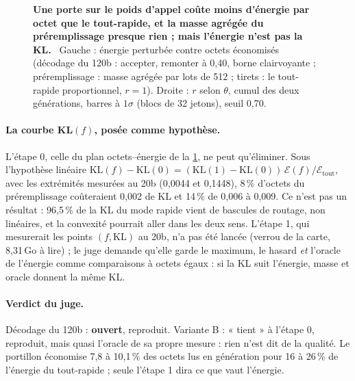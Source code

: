 \begin{figure}[tbp]
\centering
{}\hfill
{}
\caption[P6 : le plan octets--énergie et $r$ selon $\theta$]{\textbf{Une porte sur le poids d'appel coûte moins d'énergie par octet que le tout-rapide, et la masse agrégée du préremplissage presque rien ; mais l'énergie n'est pas la KL.} \mes~Gauche : énergie perturbée contre octets économisés (décodage du 120b : accepter, remonter à 0,40, borne clairvoyante ; préremplissage : masse agrégée par lots de 512 ; tirets : le tout-rapide proportionnel, $r = 1$). Droite : $r$ selon $\theta$, cumul des deux générations, barres à $1\sigma$ (blocs de 32 jetons), seuil 0,70. \HorsStyle{}}
\label{fig:t3-mim-p6}
\end{figure}

\paragraph{La courbe KL$(f)$, posée comme hypothèse.} L'étape 0, celle du plan octets--énergie de la \cref{fig:t3-mim-p6}, ne peut qu'éliminer. Sous l'hypothèse linéaire $\mathrm{KL}(f) - \mathrm{KL}(0) = (\mathrm{KL}(1) - \mathrm{KL}(0))\,\mathcal E(f)/\mathcal E_{\text{tout}}$, avec les extrémités mesurées au 20b (0,0044 et 0,1448), 8\,\% d'octets du préremplissage coûteraient 0,002 de KL et 14\,\% de 0,006 à 0,009. Ce n'est pas un résultat : 96,5\,\% de la KL du mode rapide vient de bascules de routage, non linéaires, et la convexité pourrait aller dans les deux sens. L'étape 1, qui mesurerait les points $(f, \mathrm{KL})$ au 20b, n'a pas été lancée (verrou de la carte, 8,31\,Go à lire) ; le juge demande qu'elle garde le maximum, le hasard \emph{et} l'oracle de l'énergie comme comparaisons à octets égaux : si la KL suit l'énergie, masse et oracle donnent la même KL.

\paragraph{Verdict du juge.} Décodage du 120b : \textbf{ouvert}, reproduit. Variante B : « tient » à l'étape 0, reproduit, mais quasi l'oracle de sa propre mesure : rien n'est dit de la qualité. Le portillon économise 7,8 à 10,1\,\% des octets lus en génération pour 16 à 26\,\% de l'énergie du tout-rapide ; seule l'étape 1 dira ce que vaut l'énergie.

